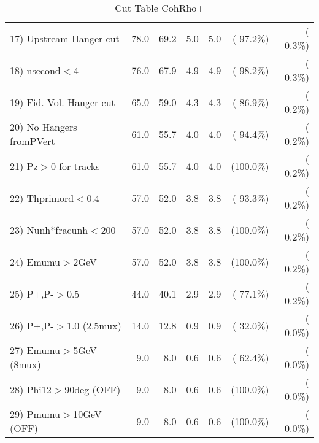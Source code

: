 \begin{table}[h!]
\begin{tabular}{||l||r|r|r|r|r|r||}
 17) Upstream Hanger cut  &         78.0 &         69.2 &          5.0 &          5.0 & ( 97.2\%) & (  0.3\%) \\
 18) nsecond$<$4          &         76.0 &         67.9 &          4.9 &          4.9 & ( 98.2\%) & (  0.3\%) \\
 19) Fid. Vol. Hanger cut &         65.0 &         59.0 &          4.3 &          4.3 & ( 86.9\%) & (  0.2\%) \\
 20) No Hangers fromPVert &         61.0 &         55.7 &          4.0 &          4.0 & ( 94.4\%) & (  0.2\%) \\
 21) Pz$>$0 for tracks    &         61.0 &         55.7 &          4.0 &          4.0 & (100.0\%) & (  0.2\%) \\
 22) Thprimord$<$0.4      &         57.0 &         52.0 &          3.8 &          3.8 & ( 93.3\%) & (  0.2\%) \\
 23) Nunh*fracunh$<$200   &         57.0 &         52.0 &          3.8 &          3.8 & (100.0\%) & (  0.2\%) \\
 24) Emumu$>$2GeV         &         57.0 &         52.0 &          3.8 &          3.8 & (100.0\%) & (  0.2\%) \\
 25) P+,P-$>$0.5          &         44.0 &         40.1 &          2.9 &          2.9 & ( 77.1\%) & (  0.2\%) \\
 26) P+,P-$>$1.0 (2.5mux) &         14.0 &         12.8 &          0.9 &          0.9 & ( 32.0\%) & (  0.0\%) \\
 27) Emumu$>$5GeV  (8mux) &          9.0 &          8.0 &          0.6 &          0.6 & ( 62.4\%) & (  0.0\%) \\
 28) Phi12$>$90deg  (OFF) &          9.0 &          8.0 &          0.6 &          0.6 & (100.0\%) & (  0.0\%) \\
 29) Pmumu$>$10GeV  (OFF) &          9.0 &          8.0 &          0.6 &          0.6 & (100.0\%) & (  0.0\%) \\
 \hline
 \hline
 \end{tabular}
 \caption{Cut Table  CohRho+  }
 \label{tab-cutcohjpsi-mumu_anumunc}
 \end{table}
